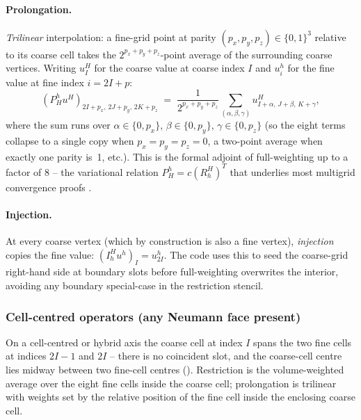 \documentclass[11pt]{article}
\theoremstyle{definition}
\begin{document}
\paragraph{Prolongation.}
\emph{Trilinear} interpolation: a fine-grid point at parity
$(p_x, p_y, p_z) \in \{0,1\}^3$ relative to its coarse cell takes the
$2^{p_x+p_y+p_z}$-point average of the surrounding coarse vertices.
Writing $u_I^H$ for the coarse value at coarse index $I$ and $u_i^h$
for the fine value at fine index $i = 2I + p$:
\begin{equation}\label{eq:prolong-dd}
  (P_H^h u^H)_{2I+p_x,\,2J+p_y,\,2K+p_z}
  \;=\;
  \frac{1}{2^{p_x+p_y+p_z}}
  \!\!\!\sum_{(\alpha,\beta,\gamma)}\!\!
  u^H_{I+\alpha,\,J+\beta,\,K+\gamma},
\end{equation}
where the sum runs over $\alpha \in \{0, p_x\}$,
$\beta \in \{0, p_y\}$, $\gamma \in \{0, p_z\}$ (so the eight terms
collapse to a single copy when $p_x = p_y = p_z = 0$, a two-point
average when exactly one parity is~1, etc.).  This is the formal
adjoint of full-weighting up to a factor of 8 -- the variational
relation $P_H^h = c (R_h^H)^T$ that underlies most multigrid
convergence proofs \cite[\S2.3.4]{trottenberg2001multigrid}.

\paragraph{Injection.}
At every coarse vertex (which by construction is also a fine vertex),
\emph{injection} copies the fine value:
$(I_h^H u^h)_{I} = u^h_{2I}$.  The code uses this to seed the
coarse-grid right-hand side at boundary slots before full-weighting
overwrites the interior, avoiding any boundary special-case in the
restriction stencil.

\subsubsection{Cell-centred operators (any Neumann face
present)}\label{sec:transfer-cc}
On a cell-centred or hybrid axis the coarse cell at index $I$ spans
the two fine cells at indices $2I - 1$ and $2I$ -- there is no
coincident slot, and the coarse-cell centre lies midway between two
fine-cell centres ().  Restriction is the
volume-weighted average over the eight fine cells inside the coarse
cell; prolongation is trilinear with weights set by the relative
position of the fine cell inside the enclosing coarse cell.
\end{document}
